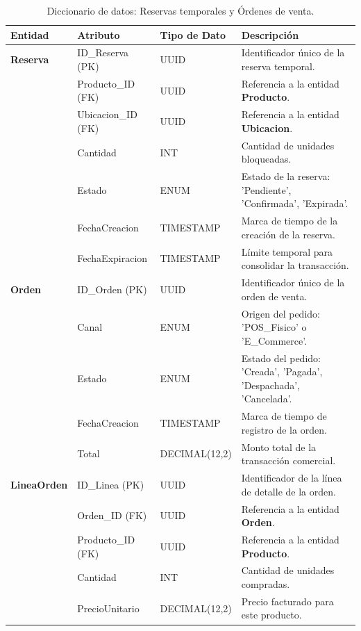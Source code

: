 \documentclass[12pt,a4paper]{article}
\begin{document}
\begin{table}[h!]
\centering
\small
\begin{tabularx}{\textwidth}{@{}lllX@{}}
\toprule
\textbf{Entidad} & \textbf{Atributo} & \textbf{Tipo de Dato} & \textbf{Descripción} \\ \midrule
\textbf{Reserva} & ID\_Reserva (PK) & UUID & Identificador único de la reserva temporal. \\
 & Producto\_ID (FK) & UUID & Referencia a la entidad \textbf{Producto}. \\
 & Ubicacion\_ID (FK) & UUID & Referencia a la entidad \textbf{Ubicacion}. \\
 & Cantidad & INT & Cantidad de unidades bloqueadas. \\
 & Estado & ENUM & Estado de la reserva: 'Pendiente', 'Confirmada', 'Expirada'. \\
 & FechaCreacion & TIMESTAMP & Marca de tiempo de la creación de la reserva. \\
 & FechaExpiracion & TIMESTAMP & Límite temporal para consolidar la transacción. \\ \addlinespace
\textbf{Orden} & ID\_Orden (PK) & UUID & Identificador único de la orden de venta. \\
 & Canal & ENUM & Origen del pedido: 'POS\_Fisico' o 'E\_Commerce'. \\
 & Estado & ENUM & Estado del pedido: 'Creada', 'Pagada', 'Despachada', 'Cancelada'. \\
 & FechaCreacion & TIMESTAMP & Marca de tiempo de registro de la orden. \\
 & Total & DECIMAL(12,2) & Monto total de la transacción comercial. \\ \addlinespace
\textbf{LineaOrden} & ID\_Linea (PK) & UUID & Identificador de la línea de detalle de la orden. \\
 & Orden\_ID (FK) & UUID & Referencia a la entidad \textbf{Orden}. \\
 & Producto\_ID (FK) & UUID & Referencia a la entidad \textbf{Producto}. \\
 & Cantidad & INT & Cantidad de unidades compradas. \\
 & PrecioUnitario & DECIMAL(12,2) & Precio facturado para este producto. \\ \bottomrule
\end{tabularx}
\caption{Diccionario de datos: Reservas temporales y Órdenes de venta.}
\end{table}
\end{document}
